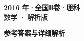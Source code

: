 \documentclass[zihao=-4, a4paper]{ctexart}
\begin{document}
\begin{center}
  {\Large\bfseries 2016 年·全国Ⅲ卷·理科}\\[4pt]
  {\large 数学 · 解析版}
\end{center}
\medskip
{}

\clearpage
{}
\begin{center}{\Large\bfseries 参考答案与详细解析}\end{center}
\medskip

\end{document}
